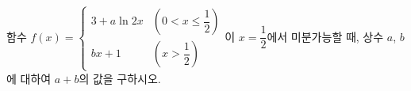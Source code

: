 함수 $f(x)=\begin{cases} 3+a\ln 2x & \left(0<x\le\dfrac{1}{2}\right) \\ bx+1 & \left(x>\dfrac{1}{2}\right) \end{cases}$이 $x=\dfrac{1}{2}$에서 미분가능할 때, 상수 $a$, $b$에 대하여 $a+b$의 값을 구하시오.
